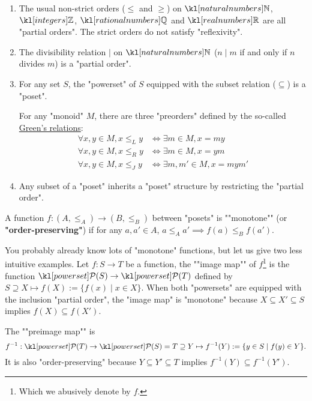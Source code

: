 \documentclass[main.tex]{subfiles}
\begin{document}
\begin{exmps}
    \begin{enumerate}
        \item The usual non-strict orders ($\leq$ and $\geq$) on $\N$, $\Z$, $\Q$ and $\R$ are all "partial orders". The strict orders do not satisfy "reflexivity".
        \item The divisibility relation $\mid$ on $\N$ ($n \mid m$ if and only if $n$ divides $m$) is a "partial order".
        \item For any set $S$, the "powerset" of $S$  equipped with the subset relation ($\subseteq$) is a "poset".\begin{marginfigure}For any "monoid" $M$, there are three "preorders" defined by the so-called \href{https://en.wikipedia.org/wiki/Green%27s_relations}{Green's relations}:
        \begin{align*}
            \forall x,y \in M, x\leq_L y &\Leftrightarrow \exists m \in M, x = my\\
            \forall x,y \in M, x\leq_R y &\Leftrightarrow \exists m \in M, x = ym\\
            \forall x,y \in M, x\leq_J y &\Leftrightarrow \exists m,m' \in M, x = mym'
        \end{align*}\end{marginfigure}
        \item Any subset of a "poset" inherits a "poset" structure by restricting the "partial order".
    \end{enumerate}
\end{exmps}
\begin{defn}[Monotone]
	\AP A function $f:(A, \leq_A) \rightarrow (B,\leq_B)$ between "posets" is ""monotone"" (or \textbf{"order-preserving"}) if for any $a, a' \in A$, $a \leq_A a' \implies f(a) \leq_B f(a')$.
\end{defn}
\begin{exmp}
    You probably already know lots of "monotone" functions, but let us give two less intuitive examples. \AP Let $f: S \rightarrow T$ be a function, the ""image map"" of $f$\footnote{Which we abusively denote by $f$.} is the function $\mP(S) \rightarrow \mP(T)$ defined by $S \supseteq X\mapsto f(X) := \{f(x) \mid x\in X\}$. When both "powersets" are equipped with the inclusion "partial order", the "image map" is "monotone" because $X \subseteq X'\subseteq S$ implies $f(X) \subseteq f(X')$.

    \AP The ""preimage map"" is \[f^{-1}: \mP(T) \rightarrow \mP(S) = T \supseteq Y \mapsto f^{-1}(Y) := \{y \in S \mid f(y) \in Y\}.\]
    It is also "order-preserving" because $Y \subseteq Y'\subseteq T$ implies $f^{-1}(Y) \subseteq f^{-1}(Y')$.
\end{exmp}
\end{document}
